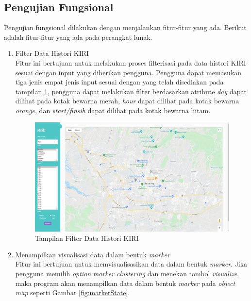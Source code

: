 \subsection{Pengujian Fungsional}
Pengujian fungsional dilakukan dengan menjalankan fitur-fitur yang ada. Berikut adalah fitur-fitur yang ada pada perangkat lunak.
\begin{enumerate}
	\item Filter Data Histori KIRI\\
	Fitur ini bertujuan untuk melakukan proses filterisasi pada data histori KIRI sesuai dengan input yang diberikan pengguna. Pengguna dapat memasukan tiga jenis empat jenis input sesuai dengan yang telah disediakan pada tampilan \ref{fig:filterState}, pengguna dapat melakukan filter berdasarkan atribute \textit{day} dapat dilihat pada kotak bewarna merah, \textit{hour} dapat dilihat pada kotak bewarna \textit{orange}, dan \textit{start/finsih} dapat dilihat pada kotak bewarna hitam.
	
	\begin{figure}[H]
	\centering  
	\includegraphics[scale=0.3]{Gambar/KIRI-UI.png}  
	\caption[Tampilan Filter Data Histori KIRI]{Tampilan Filter Data Histori KIRI} 
	\label{fig:filterState}
	\end{figure}
	
	\item Menampilkan visualisasi data dalam bentuk \textit{marker}\\
	Fitur ini bertujuan untuk memvisualisasikan data dalam bentuk \textit{marker}. Jika pengguna memilih \textit{option} \textit{marker clustering} dan menekan tombol \textit{visualize}, maka program akan menampilkan data dalam bentuk \textit{marker} pada \textit{object} \textit{map} seperti Gambar \ref{fig:markerState}.
	

\end{enumerate}
